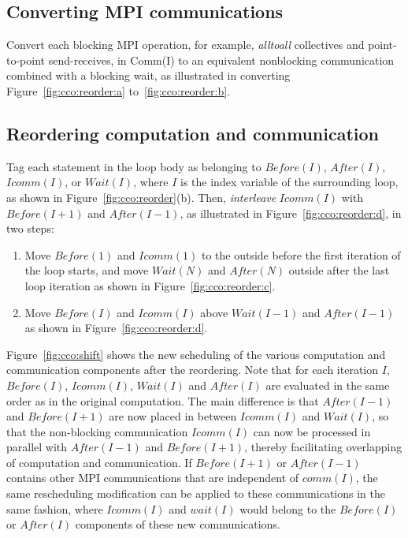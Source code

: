 \subsection{Converting MPI communications}

Convert each blocking MPI operation, for example, {\em alltoall} collectives
and point-to-point send-receives, in Comm(I) to an equivalent
nonblocking communication combined with a blocking wait, as illustrated in converting
Figure~\ref{fig:cco:reorder:a} to~\ref{fig:cco:reorder:b}.


\subsection{Reordering computation and communication}

Tag each statement in the loop body as belonging to $Before(I)$,
$After(I)$, $Icomm(I)$, or $Wait(I)$, where $I$ is the index
variable of the surrounding loop, as shown in Figure~\ref{fig:cco:reorder}(b).
Then, \emph{interleave} $Icomm(I)$ with $Before(I+1)$ and $After(I-1)$, as illustrated in
Figure~\ref{fig:cco:reorder:d}, in two steps:

\begin{enumerate}

\item Move $Before(1)$ and $Icomm(1)$ to the outside before the first
  iteration of the loop starts, and move $Wait(N)$ and $After(N)$
  outside after the last loop iteration as shown in
  Figure~\ref{fig:cco:reorder:c}.

\item Move $Before(I)$ and $Icomm(I)$ above $Wait(I-1)$ and
  $After(I-1)$ as shown in Figure~\ref{fig:cco:reorder:d}.

\end{enumerate}
Figure~\ref{fig:cco:shift} shows the new scheduling of the various computation and communication components after the reordering.
 Note that for each iteration $I$, $Before(I)$, $Icomm(I)$, $Wait(I)$ and $After(I)$ are evaluated in the same order as in the original
 computation. The main difference is that $After(I-1)$ and $Before(I+1)$ are now placed in between $Icomm(I)$ and $Wait(I)$, 
 so that the non-blocking communication $Icomm(I)$ can now be processed in parallel with $After(I-1)$ and $Before(I+1)$,
 thereby facilitating overlapping of computation and communication. If $Before(I+1)$ or $After(I-1)$ contains other MPI communications
that are independent of $comm(I)$, the same rescheduling modification can be applied to these communications in the same fashion, where $Icomm(I)$ and $wait(I)$ would belong to the $Before(I)$ or $After(I)$ components of these new communications. 


